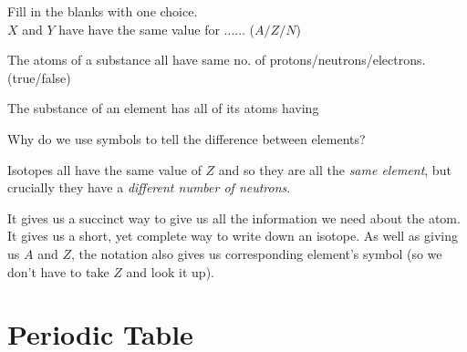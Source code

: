 
\begin{example}
Fill in the blanks with one choice. \\
$X$ and $Y$ have have the same value for ...... ($A/Z/N$) 
\end{example}

\frmrule 

\begin{example}
The atoms of a substance all have same no. of protons/neutrons/electrons.  (true/false) \\
\end{example}

The substance of an element has all of its atoms having


\begin{example}
Why do we use symbols to tell the difference between elements?
\end{example}


\frmrule 


\frmrule 


Isotopes all have the same value of $Z$ and so they are all the \textit{same element}, but
crucially they have a \textit{different number of neutrons}. 

\frmrule


\begin{example}

\end{example}

\frmrule


It gives us a succinct way to give us all the information we 
need about the atom. It gives us a short, yet complete way to 
write down an isotope. As well as giving us $A$ and $Z$, the notation 
also gives us corresponding element's symbol (so we don't have to take $Z$ and look it up).

\section{Periodic Table}


